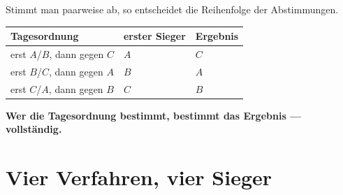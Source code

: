 \begin{merksatz}
Stimmt man paarweise ab, so entscheidet die Reihenfolge der Abstimmungen.

\begin{center}
{\small
\renewcommand{\arraystretch}{1.5}
\begin{tabular}{@{}P{3.0cm}P{2.6cm}P{2.4cm}@{}}
\toprule
\textbf{Tagesordnung} & \textbf{erster Sieger} & \textbf{Ergebnis}\\
\midrule
erst $A$/$B$, dann gegen $C$ & $A$ & $C$\\
erst $B$/$C$, dann gegen $A$ & $B$ & $A$\\
erst $C$/$A$, dann gegen $B$ & $C$ & $B$\\
\bottomrule
\end{tabular}}
\end{center}

\begin{center}
\begin{minipage}{0.9\textwidth}
\textbf{Wer die Tagesordnung bestimmt, bestimmt das Ergebnis --- vollständig.}
\end{minipage}
\end{center}

\begin{center}
\begin{minipage}{0.88\textwidth}
\end{minipage}
\end{center}
\end{merksatz}

\section{Vier Verfahren, vier Sieger}

